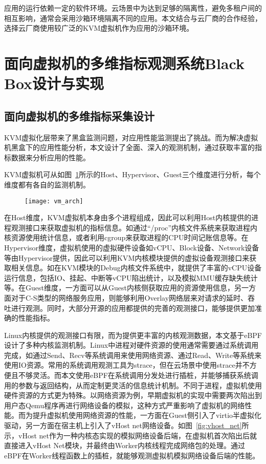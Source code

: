 应用的运行依赖一定的软件环境。云场景中为达到足够的隔离性，避免多租户间的相互影响，通常会采用沙箱环境隔离不同的应用。本文结合与云厂商的合作经验，选择云厂商使用较广泛的KVM虚拟机作为应用的沙箱环境。

\section{面向虚拟机的多维指标观测系统Black Box设计与实现}

\subsection{面向虚拟机的多维指标采集设计}


KVM虚拟化层带来了黑盒监测问题，对应用性能监测提出了挑战。而为解决虚拟机黑盒下的应用性能分析，本文设计了全面、深入的观测机制，通过获取丰富的指标数据来分析应用的性能。

KVM虚拟机可从如图~\ref{fig:vm_arch}所示的Host、Hypervisor、Guest三个维度进行分析，每个维度都有各自的监测机制。

\begin{figure}[!htbp]
    \centering
    \texttt{[image: vm\_arch]}
    \label{fig:vm_arch}
\end{figure}

在Host维度，KVM虚拟机本身由多个进程组成，因此可以利用Host内核提供的进程观测接口来获取虚拟机的指标信息。如通过“/proc”内核文件系统来获取进程内核资源使用统计信息，或者利用cgroup来获取进程的CPU时间记账信息等。在Hypervisor维度，虚拟机使用的虚拟硬件设备如vCPU、Block设备、Network设备等由Hypervisor提供，因此可以利用KVM内核模块提供的虚拟设备观测接口来获取相关信息。如在KVM模块的Debug内核文件系统中，就提供了丰富的vCPU设备运行信息，包括IO、挂起、中断等vCPU陷出统计，以及模拟MMU缓存缺失统计等。在Guest维度，一方面可以从Guest内核侧获取应用的资源使用信息，另一方面对于C-S类型的网络服务应用，则能够利用Overlay网络层来对请求的延时、吞吐进行观测。同时，大部分开源的应用都提供的完善的观测接口，能够提供更加准确的性能指标。

Linux内核提供的观测接口有限，而为提供更丰富的内核观测数据，本文基于eBPF设计了多种内核监测机制。Linux中进程对硬件资源的使用通常需要通过系统调用完成，如通过Send、Recv等系统调用来使用网络资源、通过Read、Write等系统来使用IO资源。常用的系统调用观测工具为strace，但在云场景中使用strace并不方便且不够灵活。而本文使用eBPF在系统调用分发处进行插桩，并能够捕获系统调用的参数与返回结构，从而定制更灵活的信息统计机制。不同于进程，虚拟机使用硬件资源的方式更为特殊。以网络资源为例，早期虚拟机的实现中需要两次陷出到用户态Qemu程序再进行网络设备的模拟，这种方式严重影响了虚拟机的网络性能。而为提升虚拟机使用网络资源的性能，一方面在Guest侧引入了virtio半虚拟化驱动，另一方面在宿主机上引入了vHost net网络设备。如图~\ref{fig:vhost_net}所示，vHost net作为一种内核态实现的模拟网络设备后端，在虚拟机首次陷出后就直接进入vHost Net模块，并最终由Worker内核线程完成网络包的处理。通过eBPF在Worker线程函数上的插桩，就能够观测虚拟机模拟网络设备后端的性能。

